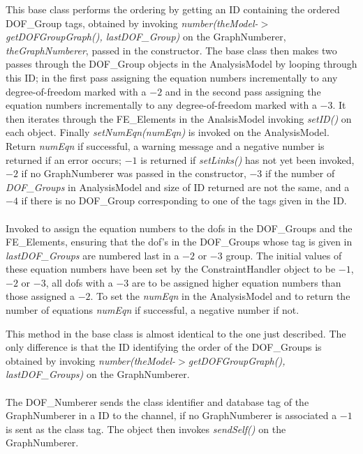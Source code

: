 This base class performs the ordering by getting an ID containing the
ordered DOF\_Group tags, obtained by invoking {\em
number(theModel-$>$getDOFGroupGraph(), lastDOF\_Group)} on the
GraphNumberer, {\em theGraphNumberer}, passed in the constructor. The
base class then makes two passes through the DOF\_Group objects in the
AnalysisModel by looping through this ID; in the first pass assigning the
equation numbers incrementally to any degree-of-freedom marked with a
$-2$ and in the second pass assigning the equation numbers
incrementally to any degree-of-freedom marked with a $-3$. It then
iterates through the FE\_Elements in the AnalsisModel invoking {\em
setID()} on each object. Finally {\em setNumEqn(numEqn)} is invoked on
the AnalysisModel. Return {\em numEqn} if successful, a warning
message and a negative number is returned if an error occurs; $-1$ is
returned if {\em setLinks()} has not yet been invoked, $-2$ if no
GraphNumberer was passed in the constructor, $-3$ if the
number of {\em DOF\_Groups} in AnalysisModel and size of ID returned
are not the same, and a $-4$ if there is no DOF\_Group corresponding
to one of the tags given in the ID.\\



 \\
Invoked to assign the equation numbers to the dofs in the DOF\_Groups
and the FE\_Elements, ensuring that the dof's in the DOF\_Groups whose
tag is given in {\em lastDOF\_Groups} are numbered last in a $-2$ or
$-3$ group. The initial values of these equation numbers have been set
by the ConstraintHandler object to be $-1$, $-2$ or $-3$, all dofs
with a $-3$ are to be assigned higher equation numbers than those
assigned a $-2$. To set the {\em numEqn} in the AnalysisModel and to
return the number of equations {\em numEqn} if successful, a negative
number if not.  

This method in the base class is almost identical to the one just
described. The only difference is that the ID identifying the order of
the DOF\_Groups is obtained by invoking {\em
number(theModel-$>$getDOFGroupGraph(), lastDOF\_Groups)} on the
GraphNumberer. \\



\\ 
The DOF\_Numberer sends the class identifier and database tag of the
GraphNumberer in a ID to the channel, if no GraphNumberer is
associated a $-1$ is sent as the class tag. The object then invokes
{\em sendSelf()} on the GraphNumberer. \\ 

